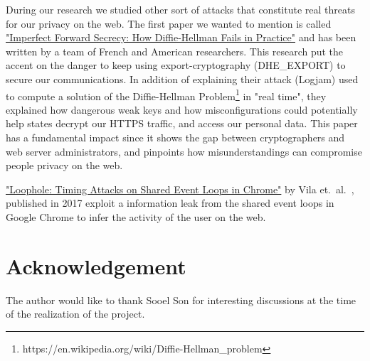 \documentclass[runningheads]{llncs}
\begin{document}
During our research we studied other sort of attacks that constitute real threats for our privacy on the web. The first paper we wanted to mention is called \ul{"Imperfect Forward Secrecy: How Diffie-Hellman Fails in Practice"} and has been written by a team of French and American researchers. This research put the accent on the danger to keep using export-cryptography (DHE\_EXPORT) to secure our communications. In addition of explaining their attack (Logjam) used to compute a solution of the Diffie-Hellman Problem\footnote{https://en.wikipedia.org/wiki/Diffie-Hellman\_problem} in "real time", they explained how dangerous weak keys and how misconfigurations could potentially help states decrypt our HTTPS traffic, and access our personal data. This paper has a fundamental impact since it shows the gap between cryptographers and web server administrators, and pinpoints how misunderstandings can compromise people privacy on the web.

\medskip

\ul{"Loophole: Timing Attacks on Shared Event Loops in Chrome"} by Vila et.~al.~, published in 2017 exploit a information leak from the shared event loops in Google Chrome to infer the activity of the user on the web.

\section{Acknowledgement}

The author would like to thank Sooel Son for interesting discussions at the time of the realization of the project.



\end{document}
